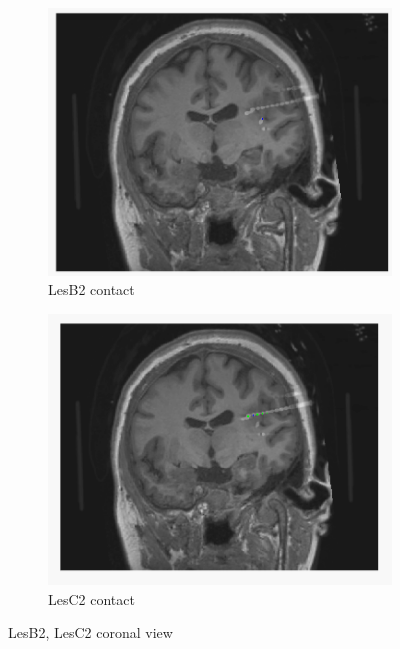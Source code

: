\documentclass[11pt,oneside]{amsart}
\begin{document}
\begin{figure}[H]
        \centering
        \begin{subfigure}[H]{.4\textwidth}
          \centering
          \includegraphics[width=\linewidth]{figures/lesb2.png}
          \caption{LesB2 contact}
           \label{fig:lesb2}
        \end{subfigure}
        \begin{subfigure}[H]{.4\textwidth}
          \centering
          \includegraphics[width=\linewidth]{figures/lesc2_image.png}  
          \caption{LesC2 contact}
          \label{fig:lesc2}
        \end{subfigure}
        \caption{LesB2, LesC2 coronal view}
         \label{fig:fig9}
        \end{figure}
\end{document}
